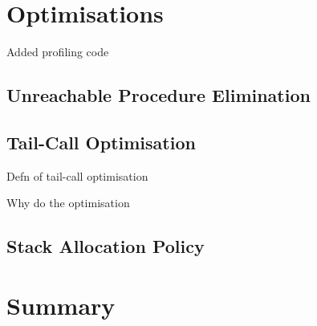 \documentclass[00-main.tex]{subfiles}
\begin{document}
\section{Optimisations}
\label{sec:impl:optimisations}

\begin{mrwComment}
Added profiling code
\end{mrwComment}

\subsection{Unreachable Procedure Elimination}

\subsection{Tail-Call Optimisation}

\begin{mrwComment}
Defn of tail-call optimisation

Why do the optimisation
\end{mrwComment}

\subsection{Stack Allocation Policy}
\label{sec:impl:optimised stack allocation}

\section{Summary}
\end{document}
